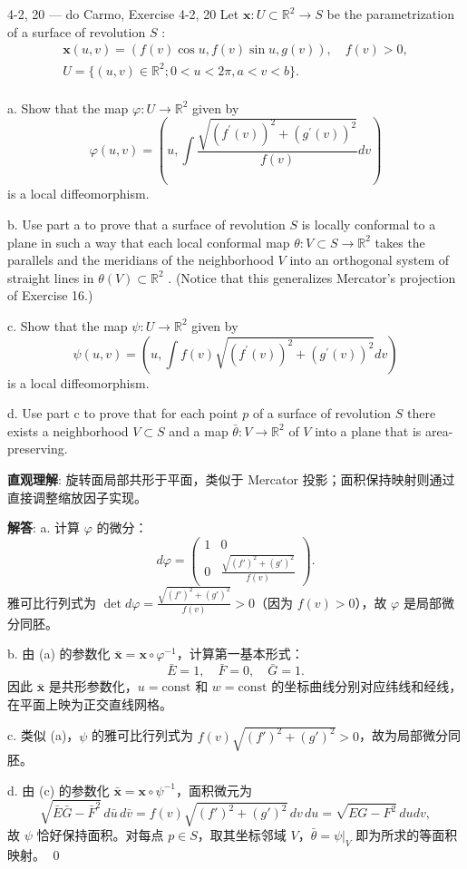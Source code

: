 \begin{exercise}{4-2, 20 — do Carmo, Exercise 4-2, 20}
Let $\mathbf{x}\colon U\subset \mathbb{R}^2\to S$ be the parametrization of a surface of revolution $S$ :
\[
\begin{array}{l} \mathbf {x} (u, v) = \left(f (v) \cos u, f (v) \sin u, g (v)\right), \quad f (v) > 0, \\ U = \{(u, v) \in \mathbb{R} ^ {2}; 0 < u < 2 \pi , a < v < b \}. \\ \end{array}
\]

a. Show that the map $\varphi \colon U\to \mathbb{R}^2$ given by
\[
\varphi (u, v) = \left(u, \int \frac {\sqrt {(f ^ {\prime} (v)) ^ {2} + (g ^ {\prime} (v)) ^ {2}}}{f (v)} d v\right)
\]
is a local diffeomorphism.

b. Use part a to prove that a surface of revolution $S$ is locally conformal to a plane in such a way that each local conformal map $\theta: V \subset S \to \mathbb{R}^2$ takes the parallels and the meridians of the neighborhood $V$ into an orthogonal system of straight lines in $\theta(V) \subset \mathbb{R}^2$ . (Notice that this generalizes Mercator's projection of Exercise 16.)

c. Show that the map $\psi \colon U\to \mathbb{R}^2$ given by
\[
\psi (u, v) = \left(u, \int f (v) \sqrt {\left(f ^ {\prime} (v)\right) ^ {2} + \left(g ^ {\prime} (v)\right) ^ {2}} d v\right)
\]
is a local diffeomorphism.

d. Use part c to prove that for each point $p$ of a surface of revolution $S$ there exists a neighborhood $V \subset S$ and a map $\bar{\theta} \colon V \to \mathbb{R}^2$ of $V$ into a plane that is area-preserving.
\end{exercise}

\begin{solution}
\textbf{直观理解}: 旋转面局部共形于平面，类似于 Mercator 投影；面积保持映射则通过直接调整缩放因子实现。

\textbf{解答}: a. 计算 $\varphi$ 的微分：
\[
d\varphi = \begin{pmatrix}1 & 0\\ 0 & \frac{\sqrt{(f')^2+(g')^2}}{f(v)}\end{pmatrix}.
\]
雅可比行列式为 $\det d\varphi = \frac{\sqrt{(f')^2+(g')^2}}{f(v)} > 0$（因为 $f(v)>0$），故 $\varphi$ 是局部微分同胚。

b. 由 (a) 的参数化 $\bar{\mathbf{x}} = \mathbf{x}\circ\varphi^{-1}$，计算第一基本形式：
\[
\bar{E} = 1,\quad \bar{F} = 0,\quad \bar{G} = 1.
\]
因此 $\bar{\mathbf{x}}$ 是共形参数化，$u=\mathrm{const}$ 和 $w=\mathrm{const}$ 的坐标曲线分别对应纬线和经线，在平面上映为正交直线网格。

c. 类似 (a)，$\psi$ 的雅可比行列式为 $f(v)\sqrt{(f')^2+(g')^2}>0$，故为局部微分同胚。

d. 由 (c) 的参数化 $\bar{\mathbf{x}} = \mathbf{x}\circ\psi^{-1}$，面积微元为
\[
\sqrt{\bar{E}\bar{G}-\bar{F}^2}\,d\bar{u}\,d\bar{v} = f(v)\sqrt{(f')^2+(g')^2}\,dv\,du = \sqrt{EG-F^2}\,dudv,
\]
故 $\psi$ 恰好保持面积。对每点 $p\in S$，取其坐标邻域 $V$，$\bar{\theta} = \psi|_V$ 即为所求的等面积映射。
\qed
\end{solution}

